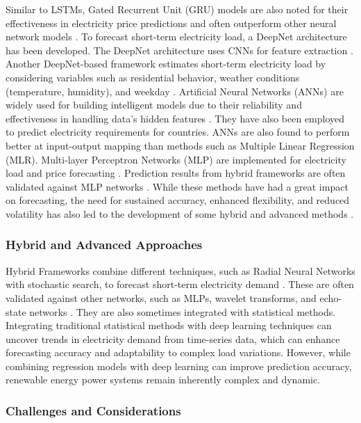 Similar to LSTMs, Gated Recurrent Unit (GRU) models are also noted for their effectiveness in electricity price predictions and often outperform other neural network models \cite{bedi2019deep}. To forecast short-term electricity load, a DeepNet architecture has been developed. The DeepNet architecture uses CNNs for feature extraction \cite{ugbehe2025}. Another DeepNet-based framework estimates short-term electricity load by considering variables such as residential behavior, weather conditions (temperature, humidity), and weekday \cite{zhao2025short,ugbehe2025,pallonetto2021}. Artificial Neural Networks (ANNs) are widely used for building intelligent models due to their reliability and effectiveness in handling data's hidden features \cite{bedi2019deep}. They have also been employed to predict electricity requirements for countries. ANNs are also found to perform better at input-output mapping than methods such as Multiple Linear Regression (MLR). Multi-layer Perceptron Networks (MLP) are implemented for electricity load and price forecasting \cite{bedi2019deep}. Prediction results from hybrid frameworks are often validated against MLP networks \cite{zhao2025short}. While these methods have had a great impact on forecasting, the need for sustained accuracy, enhanced flexibility, and reduced volatility has also led to the development of some hybrid and advanced methods \cite{pallonetto2021,ugbehe2025}. 

 

\subsubsection {Hybrid and Advanced Approaches} 

Hybrid Frameworks combine different techniques, such as Radial Neural Networks with stochastic search, to forecast short-term electricity demand \cite{zhao2025short}. These are often validated against other networks, such as MLPs, wavelet transforms, and echo-state networks \cite{bedi2019deep}. They are also sometimes integrated with statistical methods. Integrating traditional statistical methods with deep learning techniques can uncover trends in electricity demand from time-series data, which can enhance forecasting accuracy and adaptability to complex load variations. However, while combining regression models with deep learning can improve prediction accuracy, renewable energy power systems remain inherently complex and dynamic.

\subsubsection {Challenges and Considerations}

